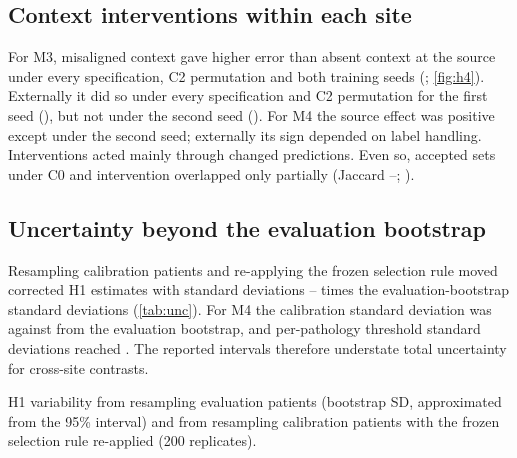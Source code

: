 \subsection*{Context interventions within each site}
For M3, misaligned context gave higher error than absent context at the source
under every specification, C2 permutation and both training seeds
(\HFourMThreesourceEval{}; \cref{fig:h4}). Externally it did so under every
specification and C2 permutation for the first seed (\HFourMThreeexternalEval{}),
but not under the second seed (\RepTwoHFourMThreeexternaleval{}). For M4 the
source effect was positive except under the second seed; externally its sign
depended on label handling. Interventions acted mainly through changed
predictions. Even so, accepted sets under C0 and intervention overlapped only
partially (Jaccard \JaccardMin{}--\JaccardMax{}; ).

\subsection*{Uncertainty beyond the evaluation bootstrap}
Resampling calibration patients and re-applying the frozen selection rule
moved corrected H1 estimates with standard deviations
\CalRatioMin{}--\CalRatioMax{} times the evaluation-bootstrap standard
deviations (\cref{tab:unc}). For M4 the calibration standard deviation was
\CalSDMFour{} against \EvalSDMFour{} from the evaluation bootstrap, and
per-pathology threshold standard deviations reached \ThrSDMaxMFour{}. The
reported intervals therefore understate total uncertainty for cross-site
contrasts.

\begin{table}[H]
\centering\footnotesize
\caption{H1 variability from resampling evaluation patients (bootstrap SD,
approximated from the 95\% interval) and from resampling calibration patients
with the frozen selection rule re-applied (200 replicates).}
\label{tab:unc}
\begin{adjustbox}{max width=\linewidth}

\end{adjustbox}
\end{table}
